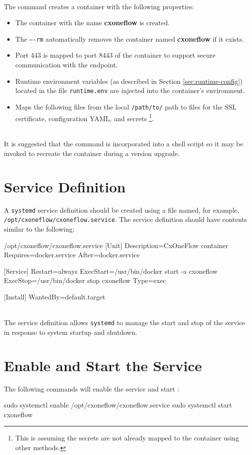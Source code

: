\noindent\\The command creates a container with the following properties:

\begin{itemize}
    \item The container with the name \textbf{cxoneflow} is created.
    \item The \texttt{----rm} automatically removes the container named \textbf{cxoneflow} if
    it exists.
    \item Port 443 is mapped to port 8443 of the container to support secure communication with
    the \cxoneflow endpoint.
    \item Runtime environment variables (as described in Section \ref{sec:runtime-config}) 
    located in the file \texttt{runtime.env} are injected into the container's environment.
    \item Maps the following files from the local \texttt{/path/to/} path to files for the SSL
    certificate, configuration YAML, and secrets
    \footnote{This is assuming the secrets are not already mapped to the container using other methods.}.
\end{itemize}

\noindent\\It is suggested that the command is incorporated into a shell script so it may be
invoked to recreate the container during a version upgrade.

\section{Service Definition}

A \texttt{systemd} service definition should be created using a file named, for example,
\\\texttt{/opt/cxoneflow/cxoneflow.service}.  The service definition should have contents
similar to the following:

\begin{code}{/opt/cxoneflow/cxoneflow.service}{}{}
[Unit]
Description=CxOneFlow container
Requires=docker.service
After=docker.service

[Service]
Restart=always
ExecStart=/usr/bin/docker start -a cxoneflow
ExecStop=/usr/bin/docker stop cxoneflow
Type=exec

[Install]
WantedBy=default.target
        
\end{code}

\noindent\\The service definition allows \texttt{systemd} to manage the start
and stop of the \cxoneflow service in response to system startup and shutdown.


\section{Enable and Start the \cxoneflow Service}

The following commands will enable the service and start \cxoneflow:

\begin{code}{}{}{}
sudo systemctl enable /opt/cxoneflow/cxoneflow.service
sudo systemctl start cxoneflow
\end{code}

